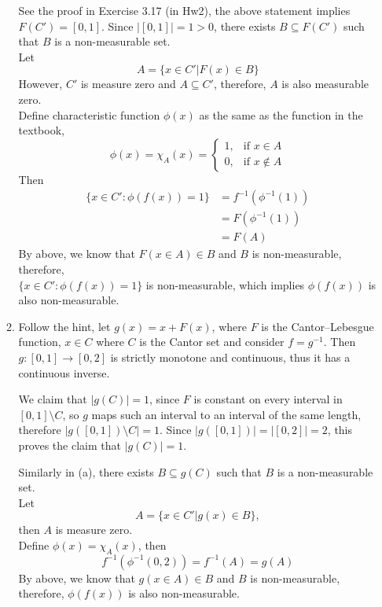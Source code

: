 \documentclass[a4paper,11pt]{article}
\begin{document}
\begin{enumerate}
\begin{enumerate}
See the proof in Exercise 3.17 (in Hw2), the above statement implies $F(C') = [0,1]$. Since $|[0,1]| = 1 > 0$, there exists $B \subseteq F(C')$ such that $B$ is a non-measurable set.\\
Let
$$A = \{ x \in C' | F(x) \in B \}$$
However, $C'$ is measure zero and $A \subseteq C'$, therefore, $A$ is also measurable zero.\\
Define characteristic function $\phi(x)$ as the same as the function in the textbook,
$$\phi(x) = \chi_A(x) = \left\{\begin{array}{ll}
1, & \mbox{if $x \in A$} \\
0, & \mbox{if $x \notin A$}
\end{array} \right.$$
Then 
$$\begin{aligned}
\{ x \in C': \phi (f(x)) = 1 \}
&= f^{-1}(\phi^{-1} (1))\\
&= F(\phi^{-1} (1))\\
&= F(A)
\end{aligned}$$
By above, we know that $F(x \in A) \in B$ and $B$ is non-measurable, therefore,\\$\{ x \in C': \phi (f(x)) = 1 \}$ is non-measurable, which implies $\phi (f(x))$ is also non-measurable.\\

\item
Follow the hint, let $g(x) = x + F(x)$, where $F$ is the Cantor–Lebesgue function, $x \in C$ where $C$ is the Cantor set and consider $f = g^{-1}$. Then $g:[0,1] \to [0,2]$ is strictly monotone and continuous, thus it has a continuous inverse.\

We claim that $|g(C)| = 1$, since $F$ is constant on every interval in $[0,1] \setminus C$, so $g$ maps such an interval to an interval of the same length, therefore $|g([0,1]) \setminus C| = 1$. Since $|g([0,1])| = |[0,2]| = 2$, this proves the claim that $|g(C)| = 1$.\

Similarly in (a), there exists $B \subseteq g(C)$ such that $B$ is a non-measurable set.\\
Let
$$A = \{ x \in C' | g(x) \in B \},$$
then $A$ is measure zero.\\
Define $\phi(x) = \chi_A(x)$, then
$$f^{-1}(\phi^{-1} (0,2) ) = f^{-1}(A) = g(A)$$
By above, we know that $g(x \in A) \in B$ and $B$ is non-measurable, therefore, $\phi (f(x))$ is also non-measurable.\\

\end{enumerate}




\end{enumerate}
\end{document}
